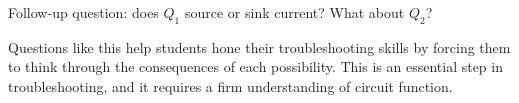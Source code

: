 \vskip 10pt

Follow-up question: does $Q_1$ source or sink current?  What about $Q_2$?







Questions like this help students hone their troubleshooting skills by forcing them to think through the consequences of each possibility.  This is an essential step in troubleshooting, and it requires a firm understanding of circuit function.




